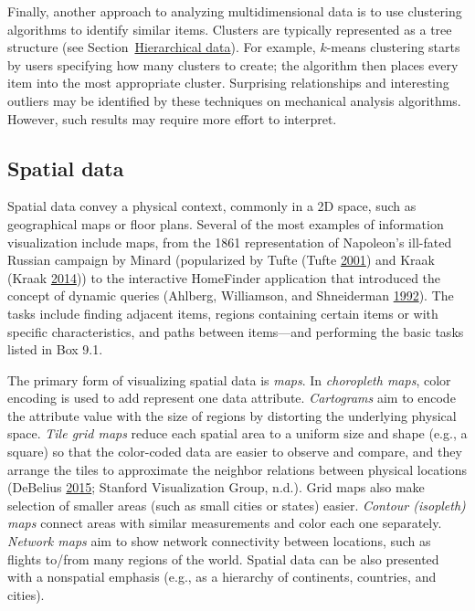 \documentclass[]{krantz}
\begin{document}
Finally, another approach to analyzing multidimensional data is to use
clustering algorithms to identify similar items. Clusters are typically
represented as a tree structure (see
Section~\protect\hyperlink{sec:viz-2.5}{Hierarchical data}). For
example, \(k\)-means clustering starts by users specifying how many
clusters to create; the algorithm then places every item into the most
appropriate cluster. Surprising relationships and interesting outliers
may be identified by these techniques on mechanical analysis algorithms.
However, such results may require more effort to interpret.

\subsection{Spatial data}\label{sec:viz-2.2}

Spatial data convey a physical context, commonly in a 2D space, such as
geographical maps or floor plans. Several of the most examples of
information visualization include maps, from the 1861 representation of
Napoleon's ill-fated Russian campaign by Minard (popularized by Tufte
(Tufte \protect\hyperlink{ref-edward2001visual}{2001}) and Kraak (Kraak
\protect\hyperlink{ref-Kraak2014}{2014})) to the interactive HomeFinder
application that introduced the concept of dynamic queries (Ahlberg,
Williamson, and Shneiderman
\protect\hyperlink{ref-ahlberg1992dynamic}{1992}). The tasks include
finding adjacent items, regions containing certain items or with
specific characteristics, and paths between items---and performing the
basic tasks listed in Box 9.1.

The primary form of visualizing spatial data is \emph{maps}. In
\emph{choropleth maps}, color encoding is used to add represent one data
attribute. \emph{Cartograms} aim to encode the attribute value with the
size of regions by distorting the underlying physical space. \emph{Tile
grid maps} reduce each spatial area to a uniform size and shape (e.g., a
square) so that the color-coded data are easier to observe and compare,
and they arrange the tiles to approximate the neighbor relations between
physical locations (DeBelius \protect\hyperlink{ref-DeBelius2015}{2015};
Stanford Visualization Group, n.d.). Grid maps also make selection of
smaller areas (such as small cities or states) easier. \emph{Contour
(isopleth) maps} connect areas with similar measurements and color each
one separately. \emph{Network maps} aim to show network connectivity
between locations, such as flights to/from many regions of the world.
Spatial data can be also presented with a nonspatial emphasis (e.g., as
a hierarchy of continents, countries, and cities).
\end{document}
